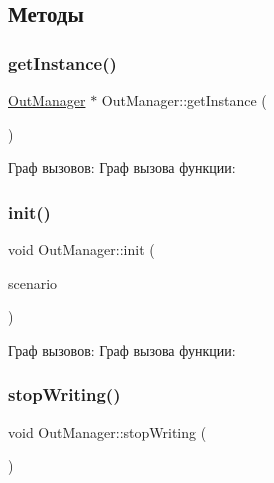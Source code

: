 \subsection{Методы}
\mbox{\label{class_out_manager_a25e2f6c90af51feae79e8233d9e746cd}} 
\subsubsection{\texorpdfstring{get\+Instance()}{getInstance()}}
{\footnotesize\ttfamily \hyperlink{class_out_manager}{Out\+Manager} $\ast$ Out\+Manager\+::get\+Instance (\begin{DoxyParamCaption}{ }\end{DoxyParamCaption})\hspace{0.3cm}{\ttfamily [static]}}

Граф вызовов\+:
Граф вызова функции\+:
\mbox{\label{class_out_manager_ab7c61a46bbb2cf29731a408ab5eb2b83}} 
\subsubsection{\texorpdfstring{init()}{init()}}
{\footnotesize\ttfamily void Out\+Manager\+::init (\begin{DoxyParamCaption}\item[{\hyperlink{_random_types_8h_ae8f073eec97d33cf9783ecbe50531dfd}{Scenario\+Type}}]{scenario }\end{DoxyParamCaption})\hspace{0.3cm}{\ttfamily [static]}}

Граф вызовов\+:
Граф вызова функции\+:
\mbox{\label{class_out_manager_a58e0db7547fda26579600c443abc7af4}} 
\subsubsection{\texorpdfstring{stop\+Writing()}{stopWriting()}}
{\footnotesize\ttfamily void Out\+Manager\+::stop\+Writing (\begin{DoxyParamCaption}{ }\end{DoxyParamCaption})}

